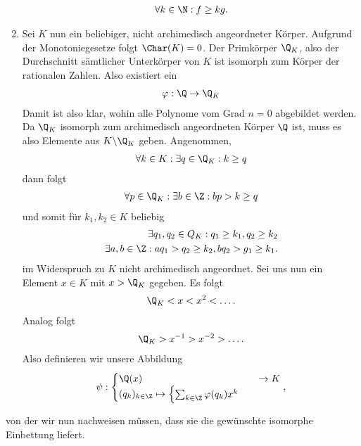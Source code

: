 \begin{solution}
\begin{enumerate}
  \begin{align*}
    \forall k \in \N: f \geq kg.
  \end{align*}
  \item Sei $K$ nun ein beliebiger, nicht archimedisch angeordneter Körper.
  Aufgrund der Monotoniegesetze folgt $\Char(K) = 0$.
  Der Primkörper $\Q_K$, also der Durchschnitt sämtlicher Unterkörper von $K$
  ist isomorph zum Körper der rationalen Zahlen. Also existiert ein
  \begin{align*}
    \varphi: \Q \to \Q_K
  \end{align*}
  Damit ist also klar, wohin
  alle Polynome vom Grad $n = 0$ abgebildet werden.
  Da $\Q_K$ isomorph zum archimedisch angeordneten Körper $\Q$ ist,
  muss es also Elemente aus $K \backslash \Q_K$ geben.
  Angenommen,
  \begin{align*}
    \forall k \in K: \exists q \in \Q_K: k \geq q
  \end{align*}
  dann folgt
  \begin{align*}
    \forall p \in \Q_K: \exists b \in \Z: bp > k \geq q
  \end{align*}
  und somit für $k_1, k_2 \in K$ beliebig
  \begin{align*}
    \exists q_1,q_2 \in Q_K: q_1 \geq k_1, q_2 \geq k_2 \\
    \exists a,b \in \Z: aq_1 > q_2 \geq k_2, bq_2 > g_1 \geq k_1.
  \end{align*}
  im Widerspruch zu $K$ nicht archimedisch angeordnet.
  Sei uns nun ein Element $x \in K$ mit $x > \Q_K$ gegeben. Es folgt
  \begin{align*}
    \Q_K < x < x^2 < \dots.
  \end{align*}
  Analog folgt
  \begin{align*}
    \Q_K > x^{-1} > x^{-2} > \dots.
  \end{align*}
  Also definieren wir unsere Abbildung
  \begin{align*}
    \psi: \begin{cases}
      \Q(x) &\to K \\
      (q_k)_{k \in \Z} \mapsto
      \begin{cases}
        \sum_{k \in \Z}\varphi(q_k)x^k
      \end{cases}
    \end{cases},
  \end{align*}
\end{enumerate}
von der wir nun nachweisen müssen, dass sie die gewünschte isomorphe Einbettung liefert.
\begin{itemize}

\end{itemize}
\end{solution}
